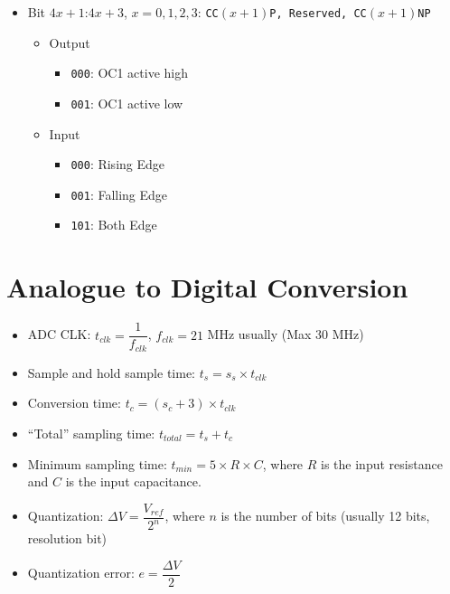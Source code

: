 \documentclass[a4paper,12pt,openany]{book}
\begin{document}
\begin{itemize}
\begin{itemize}
\begin{itemize}
\begin{itemize}
            \end{itemize}
        \end{itemize}
        \item Bit $4x+1$:$4x+3$, $x = 0,1,2,3$: \texttt{CC$(x+1)$P, Reserved, CC$(x+1)$NP}
        \begin{itemize}
            \item Output
            \begin{itemize}
                \item \texttt{000}: OC1 active high
                \item \texttt{001}: OC1 active low
            \end{itemize}
            \item Input
            \begin{itemize}
                \item \texttt{000}: Rising Edge
                \item \texttt{001}: Falling Edge
                \item \texttt{101}: Both Edge
            \end{itemize}
        \end{itemize}
    \end{itemize}
\end{itemize}

\chapter{Analogue to Digital Conversion}
\begin{itemize}
    \item ADC CLK: $t_{clk} = \dfrac{1}{f_{clk}}$, $f_{clk} = 21$ MHz usually (Max 30 MHz)
    \item Sample and hold sample time: $t_{s} = s_s \times t_{clk}$
    \item Conversion time: $t_{c} = (s_c + 3) \times t_{clk}$
    \item ``Total'' sampling time: $t_{total} = t_{s} + t_{c}$
    \item Minimum sampling time: $t_{min} = 5 \times R \times C$, where $R$ is the input resistance and $C$ is the input capacitance.
    \item Quantization: $\Delta V = \dfrac{V_{ref}}{2^n}$, where $n$ is the number of bits (usually 12 bits, resolution bit)
    \item Quantization error: $e = \dfrac{\Delta V}{2}$
\end{itemize}
\end{document}
